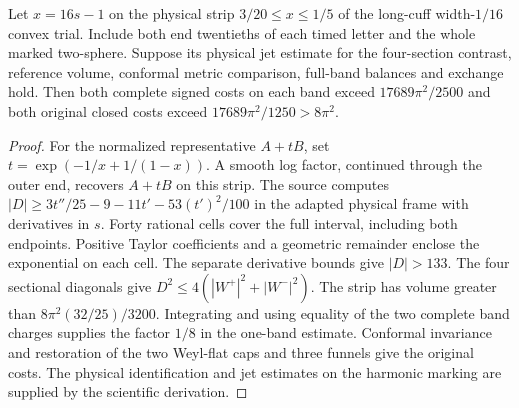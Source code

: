 \begin{proposition}
\label{prop:ed53-pause-strip}
\leanok
Let $x=16s-1$ on the physical strip $3/20\le x\le1/5$ of the
long-cuff width-$1/16$ convex trial. Include both end twentieths of
each timed letter and the whole marked two-sphere. Suppose its physical
jet estimate for the four-section contrast, reference volume, conformal
metric comparison, full-band balances and exchange hold. Then both
complete signed costs on each band exceed $17689\pi^2/2500$ and both
original closed costs exceed $17689\pi^2/1250>8\pi^2$.
\end{proposition}
\begin{proof}
\leanok
For the normalized representative $A+tB$, set $t=\exp(-1/x+1/(1-x))$.
A smooth log factor, continued through the outer end, recovers $A+tB$ on this strip.
The source computes $|D|\ge 3t''/25-9-11t'-53(t')^2/100$ in the
adapted physical frame with derivatives in $s$. Forty rational cells
cover the full interval, including both endpoints. Positive Taylor
coefficients and a geometric remainder enclose the exponential on each
cell. The separate derivative bounds give $|D|>133$. The four
sectional diagonals give $D^2\le4(|W^+|^2+|W^-|^2)$. The strip has
volume greater than $8\pi^2(32/25)/3200$. Integrating and using
equality of the two complete band charges supplies the factor $1/8$
in the one-band estimate. Conformal invariance and restoration of the
two Weyl-flat caps and three funnels give the original costs. The
physical identification and jet estimates on the harmonic marking
are supplied by the scientific derivation.
\end{proof}

